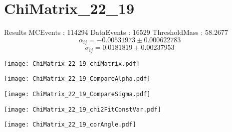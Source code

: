 \documentclass[a4paper,12pt]{article}
\begin{document}
\section{ChiMatrix\_22\_19}
\begin{minipage}{0.49\linewidth} Results \newline
MCEvents : 114294\newline
DataEvents : 16529 \newline
ThresholdMass : 58.2677\\
$$\alpha_{ij} = -0.00531973\pm 0.000622783$$
$$\sigma_{ij} = 0.0181819\pm 0.00237953$$
\end{minipage}\hfill
\begin{minipage}{0.49\linewidth} 
\texttt{[image: ChiMatrix\_22\_19\_chiMatrix.pdf]}\\
\end{minipage}
\hfill
\begin{minipage}{0.49\linewidth} 
\texttt{[image: ChiMatrix\_22\_19\_CompareAlpha.pdf]}\\
\end{minipage}
\hfill
\begin{minipage}{0.49\linewidth} 
\texttt{[image: ChiMatrix\_22\_19\_CompareSigma.pdf]}\\
\end{minipage}
\begin{minipage}{0.49\linewidth} 
\texttt{[image: ChiMatrix\_22\_19\_chi2FitConstVar.pdf]}\\
\end{minipage}
\hfill
\begin{minipage}{0.49\linewidth} 
\texttt{[image: ChiMatrix\_22\_19\_corAngle.pdf]}\\
\end{minipage}
\end{document}
